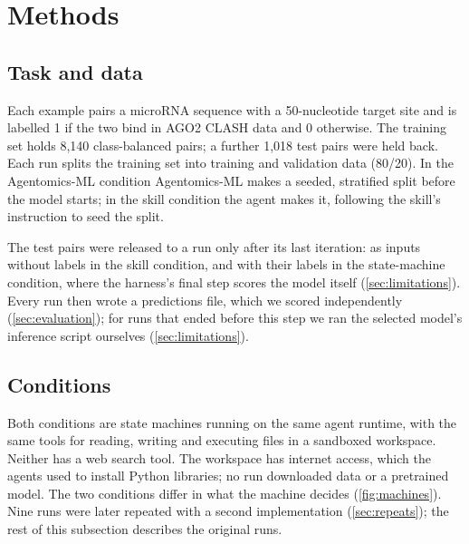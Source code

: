 \section{Methods}\label{sec:methods}

\subsection{Task and data}\label{sec:data}

Each example pairs a microRNA sequence with a 50-nucleotide target site and is labelled 1 if the two bind in AGO2
CLASH data and 0 otherwise. The training set holds 8,140 class-balanced pairs; a further 1,018
test pairs were held back. Each run splits the training set into training and validation data (80/20). In the
Agentomics-ML condition Agentomics-ML makes a seeded, stratified split before the model starts; in the skill condition
the agent makes it, following the skill's instruction to seed the split.

The test pairs were released to a run only after its last iteration: as inputs without labels in the skill condition,
and with their labels in the state-machine condition, where the harness's final step scores the model itself
(\cref{sec:limitations}). Every run then wrote a
predictions file, which we scored independently (\cref{sec:evaluation}); for \HandCount{} runs that ended before this
step we ran the selected model's inference script ourselves (\cref{sec:limitations}).

\subsection{Conditions}\label{sec:conditions}

Both conditions are state machines running on the same agent runtime, with the same tools for reading, writing and
executing files in a sandboxed workspace. Neither has a web search tool. The workspace has internet access, which the
agents used to install Python libraries; no run downloaded data or a pretrained model. The two conditions differ in
what the machine decides (\cref{fig:machines}). Nine runs were later repeated with a second implementation
(\cref{sec:repeats}); the rest of this subsection describes the original runs.

